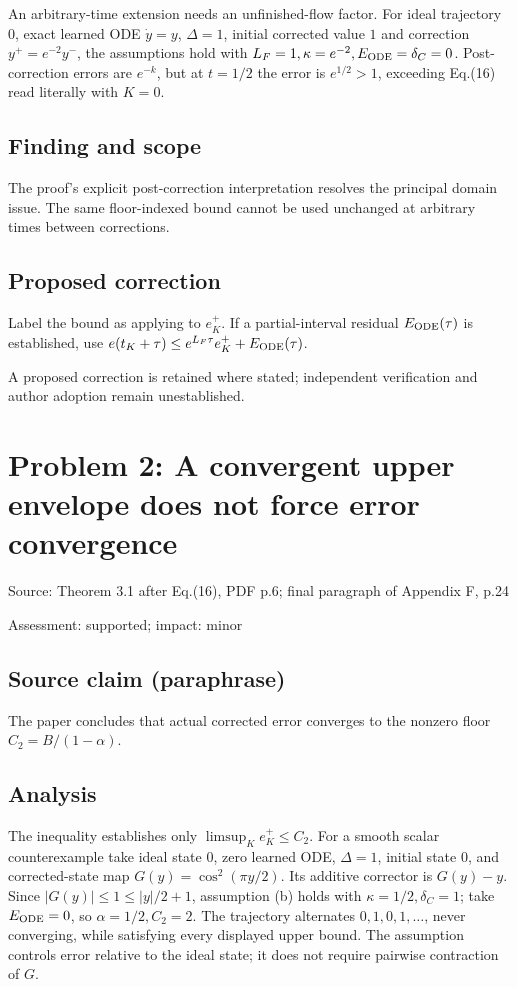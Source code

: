\documentclass[11pt]{article}
\begin{document}
An arbitrary-time extension needs an unfinished-flow factor. For ideal trajectory \(0\), exact learned ODE \(\dot y=y\), \(\Delta=1\), initial corrected value \(1\) and correction \(y^+=e^{-2}y^-\), the assumptions hold with \(L_F=1,\kappa=e^{-2},E_{\rm ODE}=\delta_C=0\). Post-correction errors are \(e^{-k}\), but at \(t=1/2\) the error is \(e^{1/2}>1\), exceeding Eq.(16) read literally with \(K=0\).

\subsection*{Finding and scope}

The proof’s explicit post-correction interpretation resolves the principal domain issue. The same floor-indexed bound cannot be used unchanged at arbitrary times between corrections.

\subsection*{Proposed correction}

Label the bound as applying to \(e_K^+\). If a partial-interval residual \(E_{\rm ODE}(\tau)\) is established, use \(e(t_K+\tau)\le e^{L_F\tau}e_K^++E_{\rm ODE}(\tau)\).

A proposed correction is retained where stated; independent verification and author adoption remain unestablished.

\section*{Problem 2: A convergent upper envelope does not force error convergence}

Source: Theorem 3.1 after Eq.(16), PDF p.6; final paragraph of Appendix F, p.24

Assessment: supported; impact: minor

\subsection*{Source claim (paraphrase)}

The paper concludes that actual corrected error converges to the nonzero floor \(C_2=B/(1-\alpha)\).

\subsection*{Analysis}

The inequality establishes only \(\limsup_K e_K^+\le C_2\). For a smooth scalar counterexample take ideal state \(0\), zero learned ODE, \(\Delta=1\), initial state \(0\), and corrected-state map \(G(y)=\cos^2(\pi y/2)\). Its additive corrector is \(G(y)-y\). Since \(|G(y)|\le1\le |y|/2+1\), assumption (b) holds with \(\kappa=1/2,\delta_C=1\); take \(E_{\rm ODE}=0\), so \(\alpha=1/2,C_2=2\). The trajectory alternates \(0,1,0,1,\ldots\), never converging, while satisfying every displayed upper bound. The assumption controls error relative to the ideal state; it does not require pairwise contraction of \(G\).
\end{document}
